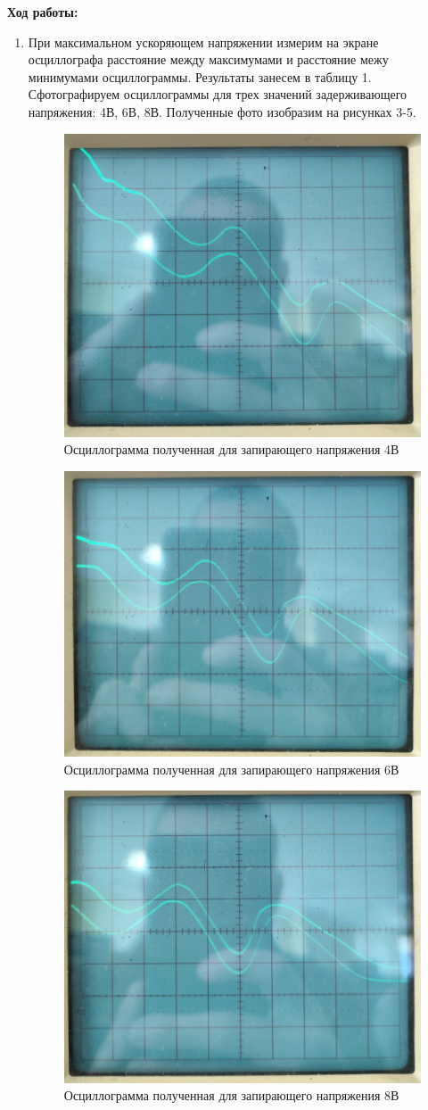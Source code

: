 \documentclass[a4paper, 12pt]{article}%
\begin{document}
	\textbf{Ход работы: }\\
	\begin{enumerate}
	

	\item При максимальном ускоряющем напряжении измерим на экране осциллографа расстояние между максимумами и расстояние межу минимумами осциллограммы. Результаты занесем в таблицу 1. Сфотографируем осциллограммы для трех значений задерживающего напряжения: 4В, 6В, 8В. Полученные фото изобразим на рисунках 3-5.
	
	\begin{figure}[H]
		\centering
		\includegraphics[width=0.6\linewidth]{4v_}
		\caption{Осциллограмма полученная для запирающего напряжения 4В}
	\end{figure}

	\begin{figure}[H]
		\centering
		\includegraphics[width=0.6\linewidth]{6v_}
		\caption{Осциллограмма полученная для запирающего напряжения 6В}
	\end{figure}

	\begin{figure}[H]
		\centering
		\includegraphics[width=0.6\linewidth]{8v_}
		\caption{Осциллограмма полученная для запирающего напряжения 8В}
	\end{figure}
	

\end{enumerate}
\end{document}
